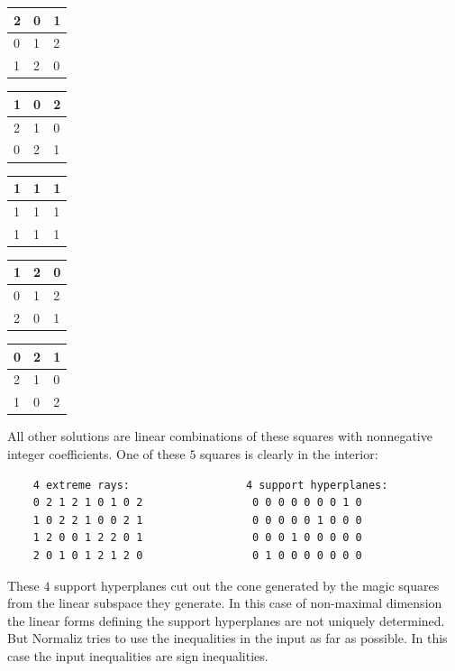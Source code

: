 \begin{center}
	\begin{tabular}{|l|l|l|}
		\hline
		2 & 0 & 1\\
		\hline
		0 & 1 & 2\\
		\hline
		1 & 2 & 0\\
		\hline
	\end{tabular}
	\hspace{10mm}
	\begin{tabular}{|l|l|l|}
		\hline
		1 & 0 & 2\\
		\hline
		2 & 1 & 0\\
		\hline
		0 & 2 & 1\\
		\hline
	\end{tabular}
	\hspace{10mm}
	\begin{tabular}{|l|l|l|}
		\hline
		1 & 1 & 1\\
		\hline
		1 & 1 & 1\\
		\hline
		1 & 1 & 1\\
		\hline
	\end{tabular}
	\hspace{10mm}
	\begin{tabular}{|l|l|l|}
		\hline
		1 & 2 & 0\\
		\hline
		0 & 1 & 2\\
		\hline
		2 & 0 & 1\\
		\hline
	\end{tabular}
	\hspace{10mm}
	\begin{tabular}{|l|l|l|}
		\hline
		0 & 2 & 1\\
		\hline
		2 & 1 & 0\\
		\hline
		1 & 0 & 2\\
		\hline
	\end{tabular}
\end{center}
All other solutions are linear combinations of these squares
with nonnegative integer coefficients.
One of these $5$ squares is clearly in the interior:
\begin{Verbatim}
	4 extreme rays:                  4 support hyperplanes:
	0 2 1 2 1 0 1 0 2                 0 0 0 0 0 0 0 1 0
	1 0 2 2 1 0 0 2 1                 0 0 0 0 0 1 0 0 0
	1 2 0 0 1 2 2 0 1                 0 0 0 1 0 0 0 0 0
	2 0 1 0 1 2 1 2 0                 0 1 0 0 0 0 0 0 0
\end{Verbatim}
These $4$ support hyperplanes cut out the cone generated by the magic squares from the linear subspace they generate. In this case of non-maximal dimension  the linear forms defining the support hyperplanes are not uniquely determined. But Normaliz tries to use the inequalities in the input as far as possible. In this case the input inequalities are sign inequalities.
